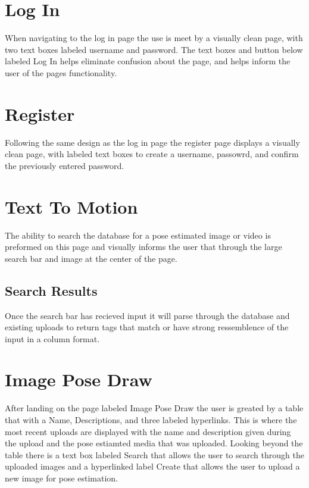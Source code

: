 \documentclass{scrreprt}
\begin{document}
\section{Log In}
When navigating to the log in page the use is meet by a visually clean page, with two text boxes labeled username and password. The text boxes and button below labeled Log In helps eliminate confusion about the page, and helps inform the user of the pages functionality.

\section{Register}
Following the same design as the log in page the register page displays a visually clean page, with labeled text boxes to create a username, passowrd, and confirm the previously entered password.

\section{Text To Motion}
The ability to search the database for a pose estimated image or video is preformed on this page and visually informs the user that through the large search bar and image at the center of the page. 

\subsection{Search Results}
Once the search bar has recieved input it will parse through the database and existing uploads to return tags that match or have strong ressemblence of the input in a column format. 

\section{Image Pose Draw}
After landing on the page labeled Image Pose Draw the user is greated by a table that with a Name, Descriptions, and three labeled hyperlinks. This is where the most recent uploads are displayed with the name and description given during the upload and the pose estiamted media that was uploaded. Looking beyond the table there is a text box labeled Search that allows the user to search through the uploaded images and a hyperlinked label Create that allows the user to upload a new image for pose estimation.
\end{document}
